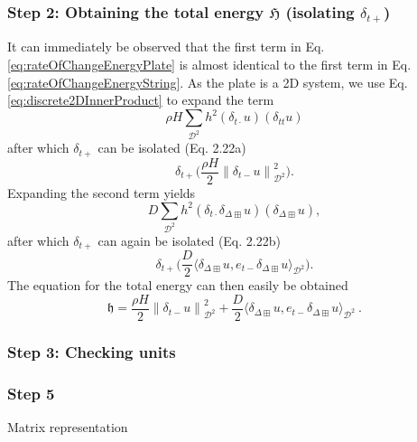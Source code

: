 \documentclass{article}
\begin{document}
\subsubsection*{Step 2: Obtaining the total energy $\mathfrak{H}$ (isolating $\delta_{t+}$)}
It can immediately be observed that the first term in Eq. \eqref{eq:rateOfChangeEnergyPlate} is almost identical to the first term in Eq. \eqref{eq:rateOfChangeEnergyString}. As the plate is a 2D system, we use Eq. \eqref{eq:discrete2DInnerProduct} to expand the term 
\begin{equation}
    \rho H\sum_{\mathcal{D}^2}h^2(\delta_{t\cdot}u)(\delta_{tt}u)
\end{equation}
after which $\delta_{t+}$ can be isolated (Eq. 2.22a)
\begin{equation}
    \delta_{t+}\Bigg(\frac{\rho H}{2} \left\lVert\delta_{t-}u\right\rVert_{\mathcal{D}^2}^2\Bigg).
\end{equation}
Expanding the second term yields
\begin{equation}
    D\sum_{\mathcal{D}^2}h^2(\delta_{t\cdot}\delta_{\Delta\boxplus}u)(\delta_{\Delta\boxplus}u),
\end{equation}
after which $\delta_{t+}$ can again be isolated (Eq. 2.22b)
\begin{equation}
    \delta_{t+}\Bigg(\frac{D}{2}\langle\delta_{\Delta\boxplus} u, e_{t-}\delta_{\Delta\boxplus} u\rangle_{\mathcal{D}^2}\Bigg).
\end{equation}
The equation for the total energy can then easily be obtained
\begin{equation}
    \mathfrak{h} = \frac{\rho H}{2} \left\lVert\delta_{t-}u\right\rVert_{\mathcal{D}^2}^2 + \frac{D}{2}\langle\delta_{\Delta\boxplus} u, e_{t-}\delta_{\Delta\boxplus} u\rangle_{\mathcal{D}^2}\ .
\end{equation}
\subsubsection*{Step 3: Checking units}

\subsubsection*{Step 5}
Matrix representation
\appendix
\end{document}
